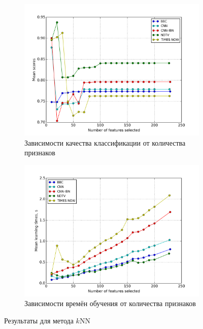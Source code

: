 \begin{figure}[h!]
    \centering
	\begin{subfigure}{0.45\textwidth}
		\includegraphics[width=\textwidth]{images/RFS-kNN.png}
		\caption{Зависимости качества классификации от количества признаков}
	\end{subfigure}
	\begin{subfigure}{0.45\textwidth}
		\includegraphics[width=\textwidth]{images/RFS-kNNTime.png}
		\caption{Зависимости времён обучения от количества признаков}
	\end{subfigure}
	\caption{Результаты для метода \(k\)NN}\label{fig:knn_rfs}
\end{figure}


